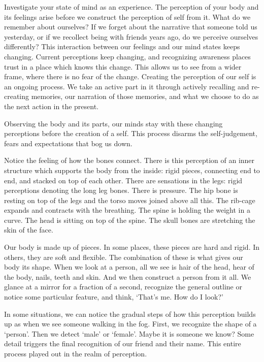 
Investigate your state of mind as an experience. The perception of your
body and its feelings arise before we construct the perception of self
from it. What do we remember about ourselves? If we forget about the
narrative that someone told us yesterday, or if we recollect being with
friends years ago, do we perceive ourselves differently? This
interaction between our feelings and our mind states keeps changing.
Current perceptions keep changing, and recognizing awareness places
trust in a place which knows this change. This allows us to see from a
wider frame, where there is no fear of the change. Creating the
perception of our self is an ongoing process. We take an active part in
it through actively recalling and re-creating memories, our narration of
those memories, and what we choose to do as the next action in the
present.


Observing the body and its parts, our minds stay with these changing
perceptions before the creation of a self. This process disarms the
self-judgement, fears and expectations that bog us down.

Notice the feeling of how the bones connect. There is this perception of
an inner structure which supports the body from the inside: rigid
pieces, connecting end to end, and stacked on top of each other. There
are sensations in the legs: rigid perceptions denoting the long leg
bones. There is pressure. The hip bone is resting on top of the legs and
the torso moves joined above all this. The rib-cage expands and
contracts with the breathing. The spine is holding the weight in a
curve. The head is sitting on top of the spine. The skull bones are
stretching the skin of the face.

Our body is made up of pieces. In some places, these pieces are hard and
rigid. In others, they are soft and flexible. The combination of these
is what gives our body its shape. When we look at a person, all we see
is hair of the head, hear of the body, nails, teeth and skin. And we
then construct a person from it all. We glance at a mirror for a
fraction of a second, recognize the general outline or notice some
particular feature, and think, `That's me. How do I look?'

In some situations, we can notice the gradual steps of how this
perception builds up as when we see someone walking in the fog. First,
we recognize the shape of a `person'. Then we detect `male' or `female'.
Maybe it is someone we know? Some detail triggers the final recognition
of our friend and their name. This entire process played out in the
realm of perception.

